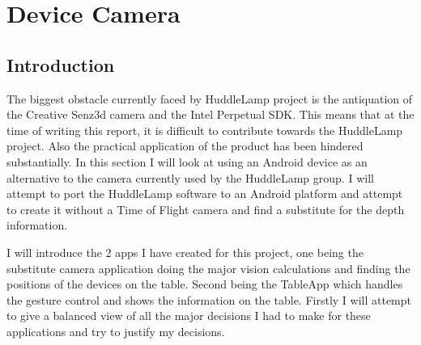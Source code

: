 \chapter{Device Camera}
 
\label{ch:devcamera}
\section{Introduction}
 
The biggest obstacle currently faced by HuddleLamp project is the antiquation of the Creative Senz3d camera and the Intel Perpetual SDK\cite{obsolete_perpetual_sdk}. This means that at the time of writing this report, it is difficult to contribute towards the HuddleLamp project. Also the practical application of the product has been hindered substantially. In this section I will look at using an Android device as an alternative to the camera currently used by the HuddleLamp group. I will attempt to port the HuddleLamp software to an Android platform and attempt to create it without a Time of Flight camera and find a substitute for the depth information.

I will introduce the 2 apps I have created for this project, one being the substitute camera application doing the major vision calculations and finding the positions of the devices on the table. Second being the TableApp which handles the gesture control and shows the information on the table. Firstly I will attempt to give a balanced view of all the major decisions I had to make for these applications and try to justify my decisions.